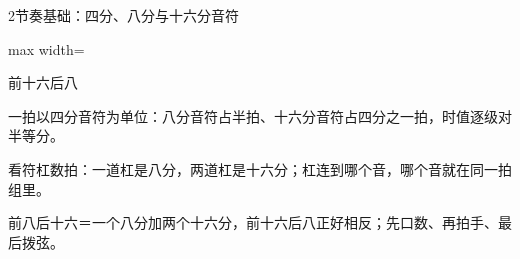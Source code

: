 \begin{lessoncard}{2}{节奏基础：四分、八分与十六分音符}
\begin{fignote}
\begin{center}
\begin{adjustbox}{max width=\textwidth}
\begin{rpattern}{前十六后八}\end{rpattern}
\end{adjustbox}
\end{center}
\begin{fignotes}
\item 一拍以四分音符为单位：八分音符占半拍、十六分音符占四分之一拍，时值逐级对半等分。
\item 看符杠数拍：一道杠是八分，两道杠是十六分；杠连到哪个音，哪个音就在同一拍组里。
\item 前八后十六＝一个八分加两个十六分，前十六后八正好相反；先口数、再拍手、最后拨弦。
\end{fignotes}
\end{fignote}
\end{lessoncard}

